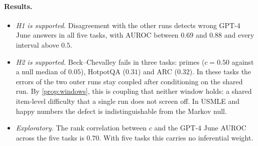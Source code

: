 \documentclass[11pt]{article}
\theoremstyle{definition}
\begin{document}
\begin{table}[!htbp]\centering\small
\caption{Study 1 (pre-registered). AUROC of the disagreement score for target runs GPT-4 June (primary) and GPT-3.5 June (secondary),
and the window Beck--Chevalley defect $c$ with its Markov-null median and Holm-adjusted $p$-value ($B=2000$; 95\% bootstrap intervals).}
\label{tab:study1}
\end{table}

\paragraph{Results.}
\begin{itemize}
\item \emph{H1 is supported.} Disagreement with the other runs detects wrong GPT-4 June answers in all five tasks, with AUROC between
  $0.69$ and $0.88$ and every interval above $0.5$.
\item \emph{H2 is supported.} Beck--Chevalley fails in three tasks: primes ($c=0.50$ against a null median of $0.05$), HotpotQA ($0.31$)
  and ARC ($0.32$). In these tasks the errors of the two outer runs stay coupled after conditioning on the shared run. By
  \cref{prop:windows}, this is coupling that neither window holds: a shared item-level difficulty that a single run does not screen
  off. In USMLE and happy numbers the defect is indistinguishable from the Markov null.
\item \emph{Exploratory.} The rank correlation between $c$ and the GPT-4 June AUROC across the five tasks is $0.70$. With five
  tasks this carries no inferential weight.
\end{itemize}
\end{document}
